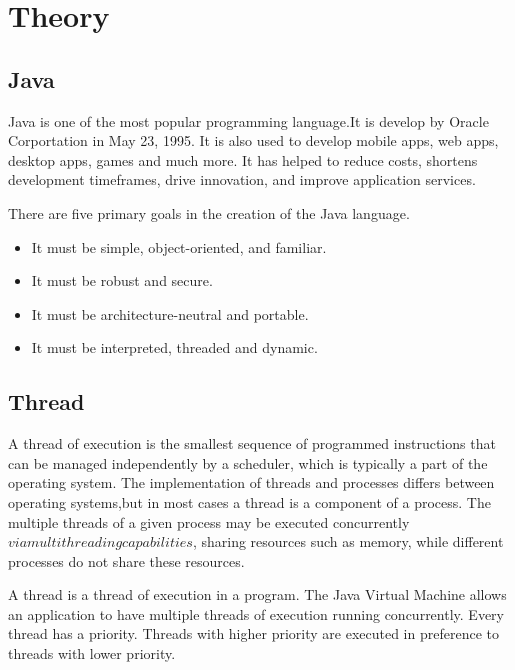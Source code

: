     \chapter{Theory}
    
    \section{Java}
    Java is one of the most popular programming language.It is develop by Oracle Corportation
    in May 23, 1995. It is also used to develop mobile apps, web apps, desktop apps, games and
    much more. It has helped to reduce costs, shortens development timeframes, drive innovation,
    and improve application services.
     \medspace

     There are five primary goals in the creation of the Java language.
     \begin{itemize}
        \item It must be simple, object-oriented, and familiar.
        \item It must be robust and secure.
        \item It must be architecture-neutral and portable.
        \item It must be interpreted, threaded and dynamic.
    \end{itemize}

    \section{Thread}
    A thread of execution is the smallest sequence of programmed instructions that can be managed 
    independently by a scheduler, which is typically a part of the operating system. The implementation
    of threads and processes differs between operating systems,but in most cases a thread is a component 
    of a process. The multiple threads of a given process may be executed concurrently 
    \(via multithreading capabilities\), sharing resources such as memory, while different processes do 
    not share these resources.
    \medspace

    A thread is a thread of execution in a program. The Java Virtual Machine allows an application to have
    multiple threads of execution running concurrently. Every thread has a priority. Threads with higher 
    priority are executed in preference to threads with lower priority.

